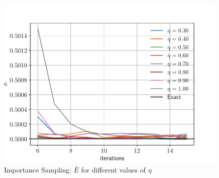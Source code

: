 \documentclass[%
oneside,                 %
final,                   %
10pt]{article}
\begin{document}
\begin{appendices}
\begin{figure}[!h]
        \centering 
         \includegraphics[scale=0.6]{../Results/sim_4/IS_eta.pdf} 
        \caption{Importance Sampling:  $\bar E$ for different values of $\eta$ }
        \label{fig:training_IS}   
\end{figure}  

\end{appendices}
\end{document}
